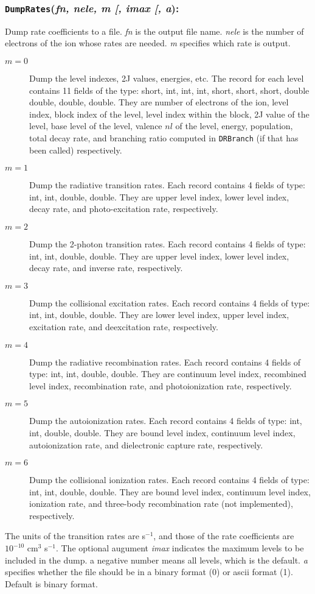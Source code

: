 \documentclass[twoside,letterpaper]{refrep}
\newcommand{\opt}[1]{
  {\textnormal{[}}{#1}\hspace{0.5mm}{\textnormal{]}}}
\newcommand{\var}[1]{\textit{#1}}
\newcommand{\key}[1]{\texttt{#1}}
\newenvironment{fundesc}[2]{
	\begin{center}
	\begin{minipage}{\textwidth}
	\subsubsection*{\key{\textbf{#1}}(\var{#2}):}
	\index{#1}
	\addcontentsline{toc}{subsubsection}{#1}}
	{\end{minipage}\end{center}}
\begin{document}
\begin{fundesc}{DumpRates}{fn, nele, m\opt{, imax\opt{, a}}}
Dump rate coefficients to a file. \var{fn} is the output file name. \var{nele}
is the number of electrons of the ion whose rates are needed. \var{m}
specifies which rate is output.
\begin{description}
\item[$m=0$]
Dump the level indexes, 2J values, energies, etc. 
The record for each level contains 11 fields of the type: short, int, int,
int, short, short, short, double double, double, double. They are number of electrons
of the ion, level index, block index of the level, level index within the
block, 2J value of the level, base level of the level, valence $nl$ of the
level, energy, population, total decay rate, and branching ratio computed in
\key{DRBranch} (if that has been called) respectively. 
\item[$m=1$]
Dump the radiative transition rates. Each record contains 4 fields of type:
int, int, double, double. They are upper level index, lower level index, decay
rate, and photo-excitation rate, respectively.
\item[$m=2$]
Dump the 2-photon transition rates. Each record contains 4 fields of type:
int, int, double, double. They are upper level index, lower level index, decay
rate, and inverse rate, respectively.
\item[$m=3$]
Dump the collisional excitation rates. Each record contains 4 fields of type:
int, int, double, double. They are lower level index, upper level index, excitation
rate, and deexcitation rate, respectively.
\item[$m=4$]
Dump the radiative recombination rates. Each record contains 4 fields of type:
int, int, double, double. They are continuum level index, recombined level index,
recombination rate, and photoionization rate, respectively.
\item[$m=5$]
Dump the autoionization rates. Each record contains 4 fields of type:
int, int, double, double. They are bound level index, continuum level index,
autoionization rate, and dielectronic capture rate, respectively.
\item[$m=6$]
Dump the collisional ionization rates. Each record contains 4 fields of type:
int, int, double, double. They are bound level index, continuum level index,
ionization rate, and three-body recombination rate (not implemented), respectively.
\end{description}
The units of the transition rates are s$^{-1}$, and those of the rate
coefficients are $10^{-10}$ cm$^{3}$ s$^{-1}$.
The optional augument \var{imax} indicates the maximum levels to be included
in the dump. a negative number means all levels, which is the default. \var{a}
specifies whether the file should be in a binary format (0) or ascii format
(1). Default is binary format.
\end{fundesc}
\end{document}
